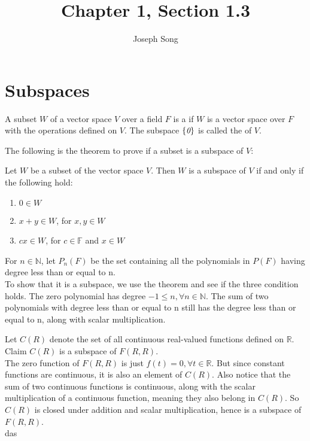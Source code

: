 \documentclass{article}
\title{Chapter 1, Section 1.3}
\author{Joseph Song}
\date{}
\begin{document}
 
 \maketitle
 
 \section{Subspaces}
 
 \begin{definition}[Subspace]
 A subset $W$ of a vector space $V$ over a field $F$ is a  if $W$ is a vector space over $F$ with the operations defined on $V$. The subspace $\{ \emph{0} \}$ is called the  of $V$.
 \end{definition}
 
 The following is the theorem to prove if a subset is a subspace of $V$:
 \begin{theorem}
     Let $W$ be a subset of the vector space $V$. Then $W$ is a subspace of $V$ if and only if the following hold:
 \end{theorem}
 \begin{enumerate}[label=(\arabic*)]
     \item $0 \in W$
     \item $x + y \in W$, for $x, y \in W$
     \item $cx \in W$, for $c \in \mathbb{F}$ and $x \in W$
 \end{enumerate}
 \begin{example}[Polynomials]
 \end{example}
 For $n \in \mathbb{N}$, let $P_n(F)$ be the set containing all the polynomials in $P(F)$ having degree less than or equal to n.
 \\
 To show that it is a subspace, we use the theorem and see if the three condition holds. The zero polynomial has degree $-1 \leq n, \forall n \in \mathbb{N}$.
 The sum of two polynomials with degree less than or equal to n still has the degree less than or equal to n, along with scalar multiplication.
 
 \begin{example}[Functions]
 \end{example}
 
 Let $C(R)$ denote the set of all continuous real-valued functions defined on $\mathbb{R}$. Claim $C(R)$ is a subspace of $F(R, R)$.
 \\
 The zero function of $F(R,R)$ is just $f(t) = 0, \forall t\in \mathbb{R}$. But since constant functions are continuous, it is also an element of $C(R)$. Also notice that the sum of two continuous functions is continuous, along with the scalar multiplication of a continuous function, meaning they also belong in $C(R)$. So $C(R)$ is closed under addition and scalar multiplication, hence is a subspace of $F(R,R)$.
 \\
das
 
\end{document}
